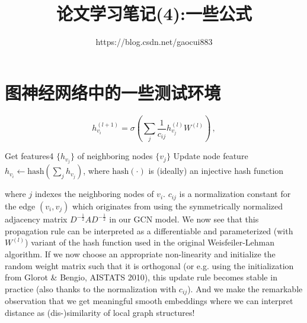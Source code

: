 \documentclass[UTF8]{ctexart}
\title{论文学习笔记(4):一些公式}
\author{https://blog.csdn.net/gaocui883}
\begin{document}
 
\maketitle
 
\section{图神经网络中的一些测试环境}


\[h^{(l+1)}_{v_i} = \sigma \left( \sum_{j} \frac{1}{c_{ij}}h^{(l)}_{v_j}W^{(l)} \right) \, ,\]

Get features4 \(\{h_{v_j}\}\) of neighboring nodes \(\{v_j\}\)
Update node feature \(h_{v_i} \leftarrow \text{hash}\left(\sum_j h_{v_j}\right)\), where \(\text{hash}(\cdot)\) is (ideally) an injective hash function


where \(j\) indexes the neighboring nodes of \(v_i\). \(c_{ij}\) is a normalization constant for the edge \((v_i,v_j)\) which originates from using the symmetrically normalized adjacency matrix \(D^{-\frac{1}{2}}AD^{-\frac{1}{2}}\) in our GCN model. We now see that this propagation rule can be interpreted as a differentiable and parameterized (with \(W^{(l)}\)) variant of the hash function used in the original Weisfeiler-Lehman algorithm. If we now choose an appropriate non-linearity and initialize the random weight matrix such that it is orthogonal (or e.g. using the initialization from Glorot \& Bengio, AISTATS 2010), this update rule becomes stable in practice (also thanks to the normalization with \(c_{ij}\)). And we make the remarkable observation that we get meaningful smooth embeddings where we can interpret distance as (dis-)similarity of local graph structures!
\end{document}

